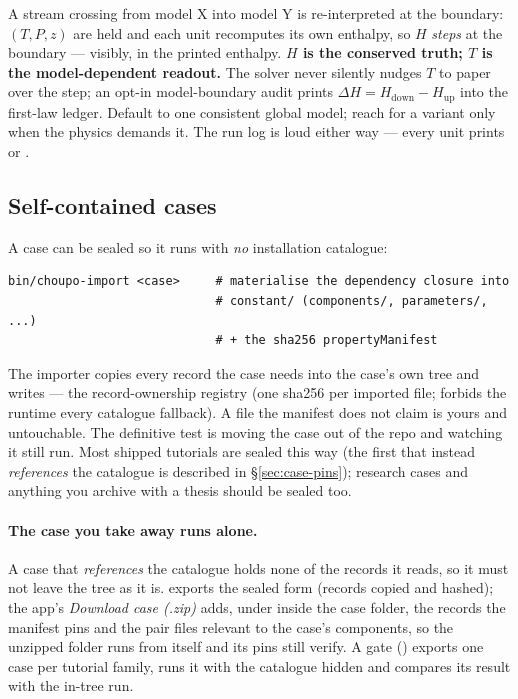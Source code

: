 \documentclass[11pt,a4paper]{article}
\begin{document}
A stream crossing from model X into model Y is re-interpreted at the
boundary: $(T,P,z)$ are held and each unit recomputes its own enthalpy,
so $H$ \emph{steps} at the boundary --- visibly, in the printed
enthalpy.  \textbf{$H$ is the conserved truth; $T$ is the
model-dependent readout.}  The solver never silently nudges $T$ to
paper over the step; an opt-in model-boundary audit prints
$\Delta H = H_{\mathrm{down}} - H_{\mathrm{up}}$ into the first-law
ledger.  Default to one consistent global model; reach for a variant
only when the physics demands it.  The run log is loud either way ---
every unit prints  or
.

\subsection{Self-contained cases}\label{sec:self-contained}

A case can be sealed so it runs with \emph{no} installation catalogue:

\begin{lstlisting}
bin/choupo-import <case>     # materialise the dependency closure into
                             # constant/ (components/, parameters/, ...)
                             # + the sha256 propertyManifest
\end{lstlisting}

The importer copies every record the case needs into the case's own
 tree and writes  --- the
record-ownership registry (one sha256 per imported file;
 forbids the runtime every catalogue fallback).  A
file the manifest does not claim is yours and untouchable.  The
definitive test is moving the case out of the repo and watching it still
run.  Most shipped tutorials are sealed this way (the first that instead
\emph{references} the catalogue is described in \S\ref{sec:case-pins}); research
cases and anything you archive with a thesis should be sealed too.

\paragraph{The case you take away runs alone.}\label{sec:export-runs-alone}
A case that \emph{references} the catalogue holds none of the records it
reads, so it must not leave the tree as it is.   exports the sealed form (records copied and hashed);
the app's \emph{Download case (.zip)} adds, under  inside
the case folder, the records the manifest pins and the pair files relevant to
the case's components, so the unzipped folder runs from itself and its pins
still verify.  A gate () exports one case
per tutorial family, runs it with the catalogue hidden and compares its result
with the in-tree run.
\end{document}
